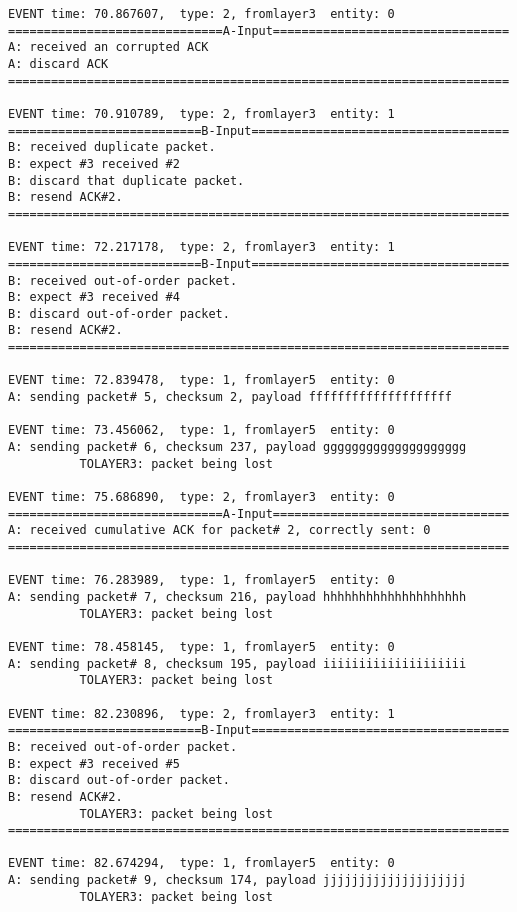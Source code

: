 \documentclass[12pt]{article}
\begin{document}
\begin{verbatim}
EVENT time: 70.867607,  type: 2, fromlayer3  entity: 0
==============================A-Input=================================
A: received an corrupted ACK 
A: discard ACK
======================================================================

EVENT time: 70.910789,  type: 2, fromlayer3  entity: 1
===========================B-Input====================================
B: received duplicate packet.
B: expect #3 received #2
B: discard that duplicate packet.
B: resend ACK#2.
======================================================================

EVENT time: 72.217178,  type: 2, fromlayer3  entity: 1
===========================B-Input====================================
B: received out-of-order packet.
B: expect #3 received #4
B: discard out-of-order packet.
B: resend ACK#2.
======================================================================

EVENT time: 72.839478,  type: 1, fromlayer5  entity: 0
A: sending packet# 5, checksum 2, payload ffffffffffffffffffff

EVENT time: 73.456062,  type: 1, fromlayer5  entity: 0
A: sending packet# 6, checksum 237, payload gggggggggggggggggggg
          TOLAYER3: packet being lost

EVENT time: 75.686890,  type: 2, fromlayer3  entity: 0
==============================A-Input=================================
A: received cumulative ACK for packet# 2, correctly sent: 0
======================================================================

EVENT time: 76.283989,  type: 1, fromlayer5  entity: 0
A: sending packet# 7, checksum 216, payload hhhhhhhhhhhhhhhhhhhh
          TOLAYER3: packet being lost

EVENT time: 78.458145,  type: 1, fromlayer5  entity: 0
A: sending packet# 8, checksum 195, payload iiiiiiiiiiiiiiiiiiii
          TOLAYER3: packet being lost

EVENT time: 82.230896,  type: 2, fromlayer3  entity: 1
===========================B-Input====================================
B: received out-of-order packet.
B: expect #3 received #5
B: discard out-of-order packet.
B: resend ACK#2.
          TOLAYER3: packet being lost
======================================================================

EVENT time: 82.674294,  type: 1, fromlayer5  entity: 0
A: sending packet# 9, checksum 174, payload jjjjjjjjjjjjjjjjjjjj
          TOLAYER3: packet being lost


\end{verbatim}
\end{document}
